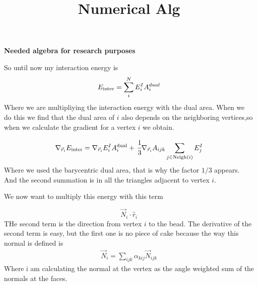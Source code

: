 \documentclass[11pt]{article}
\title{Numerical Alg}
\theoremstyle{plain}
\theoremstyle{definition}
\begin{document}
\fancyhead[L]{ }

\begin{center}
\LARGE\textbf{Needed algebra for research purposes  \\}
\vspace{3 mm}
\end{center}


So until now my interaction energy is 
\begin{equation}
  E_{\rm inter}=\sum_{i}^N E^{I}_{i} A^{dual}_i
\end{equation}
Where we are multipliying the interaction energy with the dual area. When we do this we find that the dual area of $i$ also depends on the neighboring vertices,so when we calculate the gradient for a vertex $i$ we obtain.

\begin{equation}
  \nabla_{\vec{r}_i} E_{\rm inter}=\nabla_{\vec{r}_i}E^I_{i}A^{\rm dual}_i +   \,\cfrac{1}{3}\nabla_{\vec{r}_i} A_{ijk}\sum_{j\in \text{Neigh}(i) }E^I_j 
\end{equation}
Where we used the barycentric dual area, that is why the factor $1/3$ appears. And the second summation is in all the triangles adjacent to vertex $i$.

We now want to multiply this energy with this term

\begin{equation}
  \vec{N}_i\cdot \hat{r}_i
\end{equation}
THe second term is the direction from vertex $i$ to the bead. The derivative of the second term is easy, but the first one is no piece of cake because the way this normal is defined is 
\begin{align}
  \vec{N}_i=\sum_{ijk} \alpha_{kij}\vec{N}_{ijk}
\end{align}
Where i am calculating the normal at the vertex as the angle weighted sum of the normals at the faces.
\end{document}
